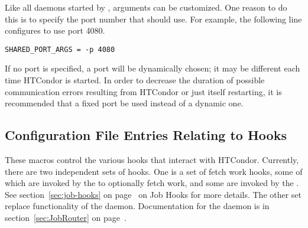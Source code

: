 \begin{description}
\label{param:SharedPortArgs}
\item[\Macro{SHARED\_PORT\_ARGS}] Like all daemons started by
 ,  arguments can be customized.
  One reason to do this is to specify the port number that
  should use.  For example, the following line
 configures  to use port 4080.

\begin{verbatim}
SHARED_PORT_ARGS = -p 4080
\end{verbatim}

If no port is specified, a port will be dynamically chosen; it may be
different each time HTCondor is started.  In order to decrease the
duration of possible communication errors resulting from HTCondor or just
 itself restarting, it is recommended that a fixed
port be used instead of a dynamic one.
\end{description}

\subsection{\label{sec:Config-hooks}Configuration File Entries Relating to Hooks}

These macros control the various hooks that interact with HTCondor.
Currently, there are two independent sets of hooks.
One is a set of fetch work hooks, some of which are invoked by
the  to optionally fetch work,
and some are invoked by the .
See section~\ref{sec:job-hooks} on page~\pageref{sec:job-hooks} on
Job Hooks for more details.
The other set replace functionality of the  daemon.
Documentation for the  daemon is in
section~\ref{sec:JobRouter} on page~\pageref{sec:JobRouter}.

